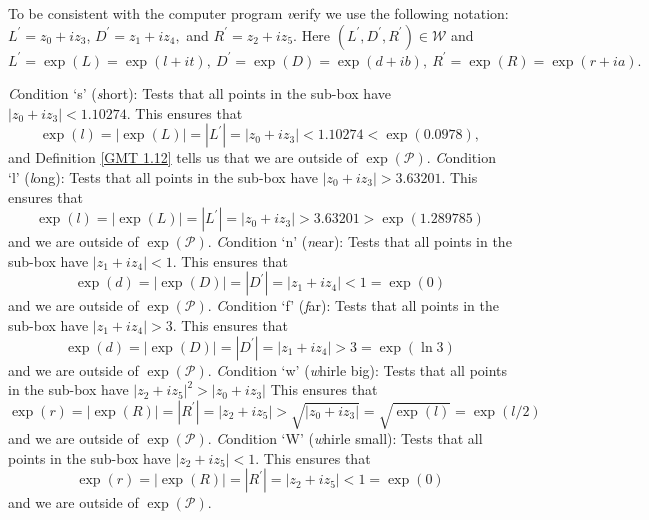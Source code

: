 To be consistent with the computer program {\textit verify} we use the following notation: $L^{\prime} = z_0 + i z_3$,
$D^{\prime} = z_1 + i z_4,$ and $R^{\prime} = z_2 + i z_5.$  Here $(L^{\prime}, D^{\prime}, R^{\prime}) \in {\mathcal W}$ and
$L^{\prime} = \exp(L) = \exp(l+it),\   D^{\prime} = \exp(D) = \exp(d+ib),\  
R^{\prime} = \exp(R) = \exp(r+ia).$
\begin{the trivial conditions}  \label{GMT 5.1}
{\textit Condition} `s' ({\textit short}):  Tests that all points in the sub-box have $|z_0 + i z_3| < 1.10274.$  This ensures that  
$$\exp(l) = |\exp(L)| = |L^{\prime}| = |z_0 + i z_3| < 1.10274 < \exp(0.0978),$$  and
Definition \ref{GMT 1.12}
 tells us that we are
outside of $\exp({\mathcal P}).$
{\textit Condition} `l' ({\textit long}): Tests that all points in the sub-box have $|z_0 + i z_3| > 3.63201.$  This ensures that  
$$\exp(l) = |\exp(L)| = |L^{\prime}| = |z_0 + i z_3| > 3.63201 > \exp(1.289785)$$ and we are outside of $\exp({\mathcal P}).$  
\vglue6pt
{\textit Condition} `n' ({\textit near}): Tests that all points in the sub-box have $|z_1 + i z_4| < 1.$  This ensures that 
$$\exp(d) = |\exp(D)| = |D^{\prime}| = |z_1 + i z_4| <1= \exp(0)$$ and we are outside of $\exp({\mathcal P}).$
\vglue6pt
{\textit Condition} `f' ({\textit far}): Tests that all points in the sub-box have $|z_1 + i z_4| > 3.$  This ensures that 
$$\exp(d) = |\exp(D)| = |D^{\prime}| = |z_1 + i z_4|  > 3= \exp(\ln 3)$$ and we are outside of $\exp({\mathcal P}).$  
\vskip 8pt
{\textit Condition} `w' ({\textit whirle  big}): Tests that all points in the sub-box have $|z_2 + i z_5|^2 > |z_0 + i z_3| $  This
ensures that $$\exp(r) = |\exp(R)| = |R^{\prime}| = |z_2 + i z_5|  > \sqrt{|z_0 + i z_3|} =  \sqrt {\exp(l)} = \exp(l/2)$$ and
we are outside of $\exp({\mathcal P}).$  
{\textit Condition} `W' ({\textit whirle  small}): Tests that all points in the sub-box have $|z_2 + i z_5| < 1. $  This ensures that
$$\exp(r) = |\exp(R)| = |R^{\prime}| = |z_2 + i z_5|  < 1 = \exp(0)$$ and we are outside of $\exp({\mathcal P}).$\end{the trivial conditions}

